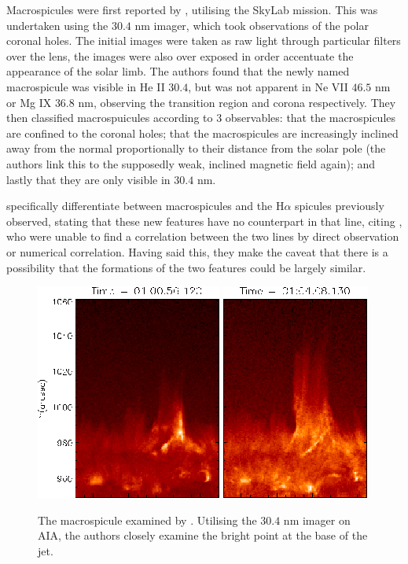 Macrospicules were first reported by \cite{Bohlin1975}, utilising the SkyLab mission.
This was undertaken using the $30.4$ nm imager, which took observations of the polar coronal holes.
The initial images were taken as raw light through particular filters over the lens, the images were also over exposed in order accentuate the appearance of the solar limb.
The authors found that the newly named macrospicule was visible in He II $30.4$, but was not apparent in Ne VII $46.5$ nm or Mg IX $36.8$ nm, observing the transition region and corona respectively.
They then classified macrospuicules according to 3 observables: that the macrospicules are confined to the coronal holes; that the macrospicules are increasingly inclined away from the normal proportionally to their distance from the solar pole (the authors link this to the supposedly weak, inclined magnetic field again); and lastly that they are only visible in $30.4$ nm. %

\cite{Bohlin1975} specifically differentiate between macrospicules and the H$\alpha$ spicules previously observed, stating that these new features have no counterpart in that line, citing \cite{Engvold1975}, who were unable to find a correlation between the two lines by direct observation or numerical correlation.
Having said this, they make the caveat that there is a possibility that the formations of the two features could be largely similar.

\begin{figure}
	\centering
	\includegraphics[scale=0.7]{Chapter2/Figs/MS1}
	\includegraphics[scale=0.7]{Chapter2/Figs/MS2}
	\caption{The macrospicule examined by \cite{Kayshap2013}. Utilising the $30.4$ nm imager on AIA, the authors closely examine the bright point at the base of the jet.}
\end{figure}


